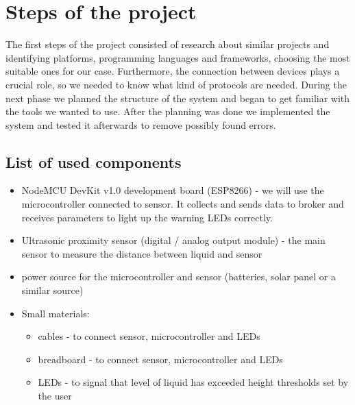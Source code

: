 \documentclass{article}
\begin{document}
\section{Steps of the project}

The first steps of the project consisted of research about similar projects and
identifying platforms, programming languages and frameworks, choosing the most
suitable ones for our case. Furthermore, the connection between devices plays a
crucial role, so we needed to know what kind of protocols are needed. During the
next phase we planned the structure of the system and began to get familiar with
the tools we wanted to use. After the planning was done we implemented the
system and tested it afterwards to remove possibly found errors.\par

\subsection{List of used components}
\begin{itemize}
\item NodeMCU DevKit v1.0 development board (ESP8266) - we will use the
  microcontroller connected to sensor. It collects and sends data to broker and
  receives parameters to light up the warning LEDs correctly.
\item Ultrasonic proximity sensor (digital / analog output module) - the main
  sensor to measure the distance between liquid and sensor
\item power source for the microcontroller and sensor (batteries, solar panel or
  a similar source)
\item Small materials:
	\begin{itemize}
  \item cables - to connect sensor, microcontroller and LEDs
  \item breadboard - to connect sensor, microcontroller and LEDs
  \item LEDs - to signal that level of liquid has exceeded height thresholds set
    by the user
	\end{itemize}
\end{itemize}
\end{document}
